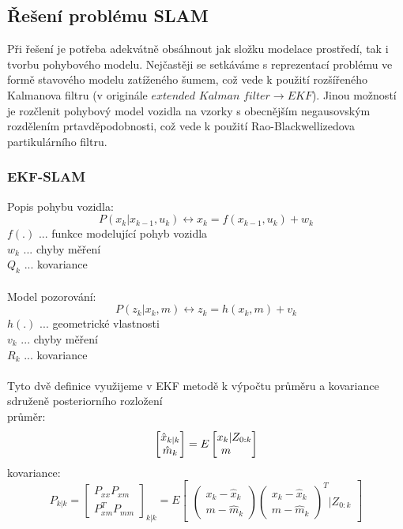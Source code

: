 \documentclass[11pt]{article}
\begin{document}
\subsection{Řešení problému SLAM}
Při řešení je potřeba adekvátně obsáhnout jak složku modelace prostředí, tak i tvorbu pohybového modelu. Nejčastěji se setkáváme s reprezentací problému ve formě stavového modelu zatíženého šumem, což vede k použití rozšířeného Kalmanova filtru (v originále $extended$ $Kalman$ $filter\rightarrow EKF$). Jinou možností je rozčlenit pohybový model vozidla na vzorky s obecnějším negausovským rozdělením prtavděpodobnosti, což vede k použití Rao-Blackwellizedova partikulárního filtru. 
\subsubsection{EKF-SLAM}
Popis pohybu vozidla:
$$P(x_k|x_{k-1},u_k)\leftrightarrow x_k=f(x_{k-1},u_k)+w_k$$
$f(.)$ ... funkce modelující pohyb vozidla\\
$w_k$ ... chyby měření\\
$Q_k$ ... kovariance\\
\\
Model pozorování:
$$P(z_k|x_k,m)\leftrightarrow z_k=h(x_k,m)+v_k $$
$h(.)$ ... geometrické vlastnosti\\
$v_k$ ... chyby měření\\
$R_k$ ... kovariance\\
\\
Tyto dvě definice využijeme v EKF metodě k výpočtu průměru a kovariance sdruženě posteriorního rozložení\\
\indent průměr:
$$\begin{bmatrix}
\hat{x}_{k|k}\\\hat{m}_k
\end{bmatrix}=E
\begin{bmatrix}
x_k |Z_{0:k}\\m\indent
\end{bmatrix}$$ 
\indent kovariance:
$$P_{k|k}=\begin{bmatrix}
P_{xx} P_{xm}\\P^T_{xm} P_{mm}
\end{bmatrix}_{k|k}=E\begin{bmatrix}
\begin{pmatrix}
x_k-\hat{x}_k\\m-\hat{m}_k
\end{pmatrix} \begin{pmatrix}
x_k-\hat{x}_k\\m-\hat{m}_k
\end{pmatrix}^T |Z_{0:k}
\end{bmatrix}$$\\
\end{document}

